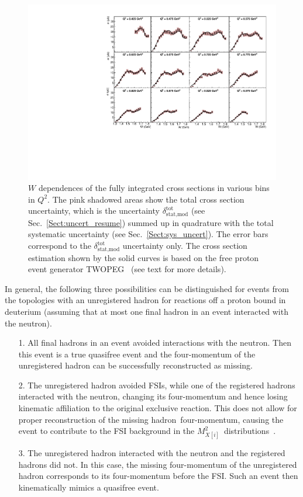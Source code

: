 \documentclass[prc,twocolumn,superscriptaddress,showpacs,amssymb,amsmath,amsfonts,aps,nofootinbib]{revtex4-1}
\begin{document}
\begin{figure}[htp]
\begin{center}
\includegraphics[width=16.25cm]{pictures/w_dep_model2.pdf}
\caption{\small $W$ dependences of the fully integrated cross sections in various bins in $Q^{2}$. The pink shadowed areas show the total cross section uncertainty, which is the uncertainty $\delta_{\text{stat,mod}}^{\text{tot}}$ (see Sec.\!~\ref{Sect:uncert_resume}) summed up in quadrature with the total systematic uncertainty (see Sec.\!~\ref{Sect:sys_uncert}). The error bars correspond to the $\delta_{\text{stat,mod}}^{\text{tot}}$ uncertainty only. The cross section estimation shown by the solid curves is based on the free proton event generator TWOPEG~\cite{twopeg} (see text for more details).} \label{fig:w_dep_model}
\end{center}
\end{figure}


In general, the following three possibilities can be distinguished for events from the topologies with an unregistered hadron for reactions off a proton bound in deuterium (assuming that at most one final hadron in an event interacted with the neutron).

\begin{itemize}
\item[1.] All final hadrons in an event avoided interactions with the neutron. Then this event is a true quasifree event and the four-momentum of the unregistered hadron can be successfully reconstructed as missing.
\item[2.] The unregistered hadron avoided FSIs, while one of the registered hadrons interacted with the neutron, changing its four-momentum and hence losing kinematic affiliation to the original exclusive reaction. This does not allow for proper reconstruction of the missing hadron~four-momentum, causing the event to contribute to the FSI background in the $M^{2}_{X[i]}$~distributions~\cite{note_mm_distr}.
\item[3.] The unregistered hadron interacted with the neutron and the registered hadrons did not. In this case, the missing four-momentum of the unregistered hadron corresponds to its four-momentum before the FSI. Such an event then kinematically mimics a quasifree event.
\end{itemize}
\end{document}
